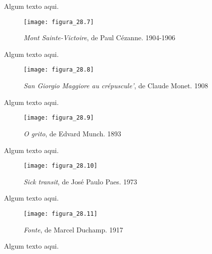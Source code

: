 Algum texto aqui.

\newpage

\begin{figure}[h]
\texttt{[image: figura\_28.7]}
\caption{\textit{Mont Sainte-Victoire}, de Paul Cézanne. 1904-1906}
\label{fig:mesh28.7}
\end{figure}

Algum texto aqui.

\newpage

\begin{figure}[h]
\texttt{[image: figura\_28.8]}
\caption{\textit{San Giorgio Maggiore au crépuscule'}, de Claude Monet. 1908}
\label{fig:mesh28.8}
\end{figure}

Algum texto aqui.

\newpage

\begin{figure}[h]
\texttt{[image: figura\_28.9]}
\caption{\textit{O grito}, de Edvard Munch. 1893}
\label{fig:mesh28.9}
\end{figure}

Algum texto aqui.

\newpage

\begin{figure}[h]
\texttt{[image: figura\_28.10]}
\caption{\textit{Sick transit}, de José Paulo Paes. 1973}
\label{fig:mesh28.10}
\end{figure}

Algum texto aqui.

\newpage

\begin{figure}[h]
\texttt{[image: figura\_28.11]}
\caption{\textit{Fonte}, de Marcel Duchamp. 1917}
\label{fig:mesh28.11}
\end{figure}

Algum texto aqui.